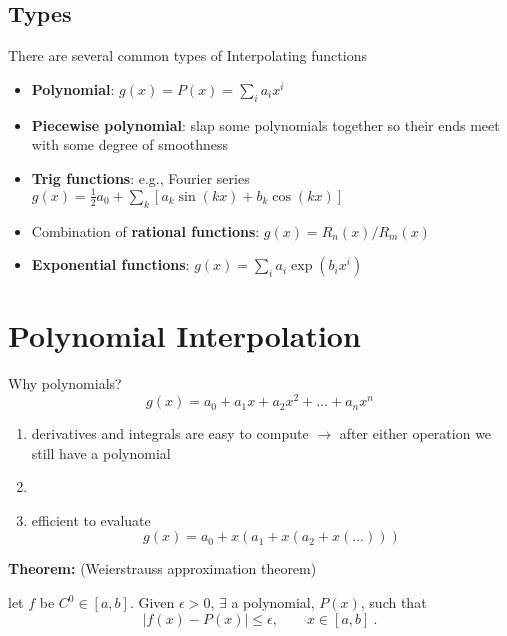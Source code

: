 \documentclass[12pt, answers]{exam}
\begin{document}
\subsection*{Types}
There are several common types of Interpolating functions
%
\begin{itemize}
\item \textbf{Polynomial}: $g(x) = P(x) = \sum_i a_i x^i$

\item \textbf{Piecewise polynomial}: slap some polynomials together so their ends meet with some degree of smoothness

\item \textbf{Trig functions}: e.g., Fourier series $g(x) = \frac{1}{2} a_0 + \sum_k [a_k \sin(kx) + b_k \cos(kx)]$ %

\item Combination of \textbf{rational functions}: $g(x) = R_n(x)/R_m(x)$

\item \textbf{Exponential functions}: $g(x) = \sum_i a_i \exp(b_i x^i)$
\end{itemize}


\section*{Polynomial Interpolation}
Why polynomials?
\[g(x) = a_0 + a_1 x + a_2 x^2 + \dots +a_n x^n\]

\begin{enumerate}
\ifprintanswers
\item derivatives and integrals are easy to compute $\rightarrow$ after either operation we still have a polynomial
\else
\item
\fi
\item efficient to evaluate
\[g(x) = a_0 + x(a_1 + x(a_2 + x(\dots)))\]
\end{enumerate}

\textbf{Theorem:} (Weierstrauss approximation theorem)

let $f$ be $C^0 \in [a,b]$. Given $\epsilon > 0$, $\exists$ a polynomial, $P(x)$, such that 
\ifprintanswers
\[|f(x) - P(x)| \leq \epsilon, \qquad x \in [a,b] \:.\]
\else
\vspace*{2em}
\fi
\end{document}
